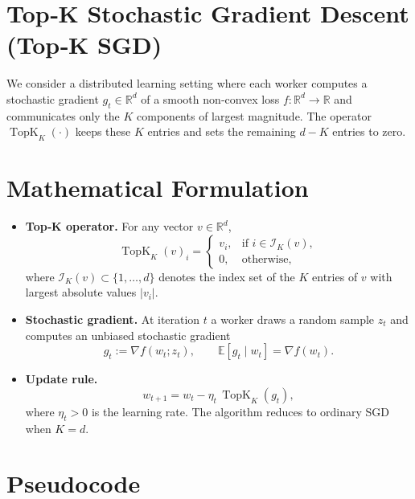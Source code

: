 \documentclass{article}
\newcommand{\TopK}{\operatorname{TopK}}
\newcommand{\EE}{\mathbb{E}}
\newcommand{\RR}{\mathbb{R}}
\begin{document}
\section*{Top‑K Stochastic Gradient Descent (Top‑K SGD)}

We consider a distributed learning setting where each worker computes a stochastic
gradient $g_t\in\RR^d$ of a smooth non‑convex loss $f:\RR^d\rightarrow\RR$ and
communicates only the $K$ components of largest magnitude.  The operator
$\TopK_K(\cdot)$ keeps these $K$ entries and sets the remaining $d-K$ entries
to zero.

\section*{Mathematical Formulation}

\begin{itemize}
  \item \textbf{Top‑K operator.} For any vector $v\in\RR^d$,
  \[
    \TopK_K(v)_i=
    \begin{cases}
      v_i, & \text{if } i\in\mathcal{I}_K(v),\\[2mm]
      0,   & \text{otherwise},
    \end{cases}
  \]
  where $\mathcal{I}_K(v)\subset\{1,\dots,d\}$ denotes the index set of the
  $K$ entries of $v$ with largest absolute values $|v_i|$.
  \item \textbf{Stochastic gradient.} At iteration $t$ a worker draws a random
  sample $z_t$ and computes an unbiased stochastic gradient
  \[
    g_t:=\nabla f(w_t;z_t),\qquad 
    \EE\!\left[g_t\mid w_t\right]=\nabla f(w_t).
  \]
  \item \textbf{Update rule.}
  \[
    w_{t+1}=w_t-\eta_t\,\TopK_K(g_t),
  \]
  where $\eta_t>0$ is the learning rate.  The algorithm reduces to ordinary
  SGD when $K=d$.
\end{itemize}

\section*{Pseudocode}
\end{document}
